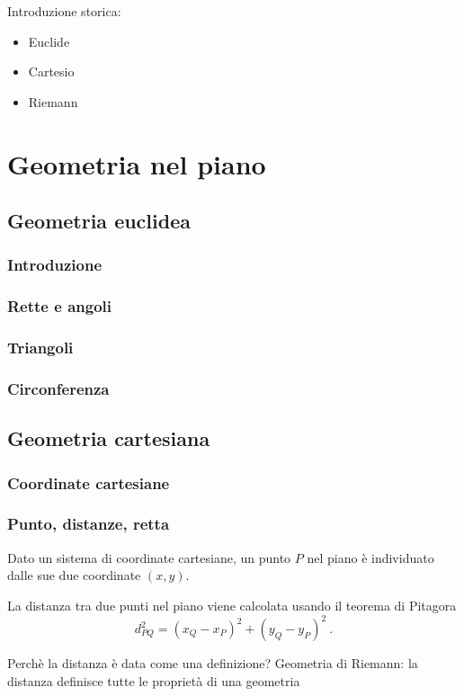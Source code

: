 
Introduzione storica:
\begin{itemize}
  \item Euclide
  \item Cartesio
  \item Riemann
\end{itemize}

\chapter{Geometria nel piano}
\section{Geometria euclidea}
\subsection{Introduzione}
\subsection{Rette e angoli}
\subsection{Triangoli}
\subsection{Circonferenza}

\section{Geometria cartesiana}
\subsection{Coordinate cartesiane}
\subsection{Punto, distanze, retta}
\begin{definition}[Punto]
Dato un sistema di coordinate cartesiane, un punto $P$ nel piano è individuato dalle sue due coordinate $(x,y)$.
\end{definition}
\begin{definition}
La distanza tra due punti nel piano viene calcolata usando il teorema di Pitagora
\begin{equation}
    d_{PQ}^2 = (x_Q - x_P)^2 + (y_Q - y_P)^2 \ .
\end{equation}
\end{definition}
{\color{red} Perchè la distanza è data come una definizione? Geometria di Riemann: la distanza definisce tutte le proprietà di una geometria}

